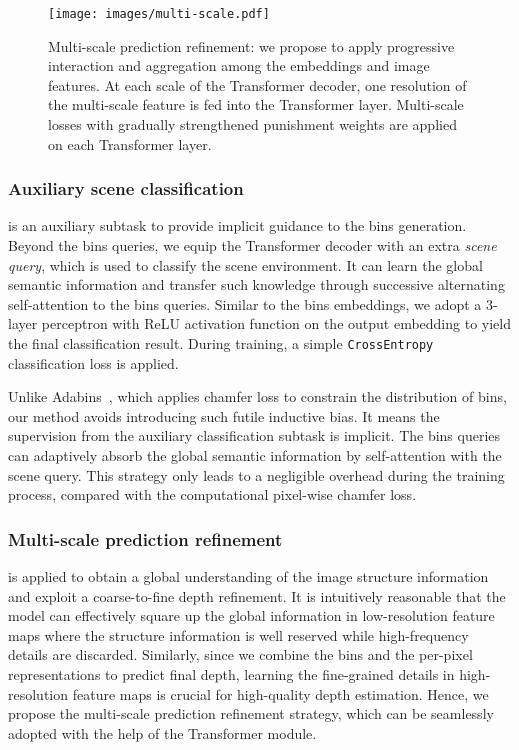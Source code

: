\documentclass[runningheads]{llncs}
\begin{document}
\begin{figure}[t]
    \texttt{[image: images/multi-scale.pdf]}
    \caption{Multi-scale prediction refinement: we propose to apply progressive interaction and aggregation among the embeddings and image features. At each scale of the Transformer decoder, one resolution of the multi-scale feature is fed into the Transformer layer. Multi-scale losses with gradually strengthened punishment weights are applied on each Transformer layer.}
    \label{fig::multi-scale}
\end{figure}

\subsubsection{Auxiliary scene classification} is an auxiliary subtask to provide implicit guidance to the bins generation. Beyond the bins queries, we equip the Transformer decoder with an extra \textit{scene query}, which is used to classify the scene environment. It can learn the global semantic information and transfer such knowledge through successive alternating self-attention to the bins queries. Similar to the bins embeddings, we adopt a 3-layer perceptron with ReLU activation function on the output embedding to yield the final classification result. During training, a simple \texttt{CrossEntropy} classification loss  is applied.

Unlike Adabins~\cite{bhat2021adabins}, which applies chamfer loss to constrain the distribution of bins, our method avoids introducing such futile inductive bias. It means the supervision from the auxiliary classification subtask is implicit. The bins queries can adaptively absorb the global semantic information by self-attention with the scene query. This strategy only leads to a negligible overhead during the training process, compared with the computational pixel-wise chamfer loss.

\subsubsection{Multi-scale prediction refinement} is applied to obtain a global understanding of the image structure information and exploit a coarse-to-fine depth refinement. It is intuitively reasonable that the model can effectively square up the global information in low-resolution feature maps where the structure information is well reserved while high-frequency details are discarded. Similarly, since we combine the bins and the per-pixel representations to predict final depth, learning the fine-grained details in high-resolution feature maps is crucial for high-quality depth estimation. Hence, we propose the multi-scale prediction refinement strategy, which can be seamlessly adopted with the help of the Transformer module.
\end{document}
